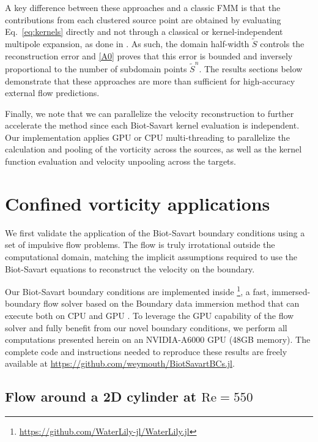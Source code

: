 \documentclass[11pt]{article}
\begin{document}
A key difference between these approaches and a classic FMM is that the contributions from each clustered source point are obtained by evaluating Eq.~\ref{eq:kernels} directly and not through a classical or kernel-independent multipole expansion, as done in \cite{Ying2004ADimensions, Liska2014AEquations}. As such, the domain half-width $\tilde S$ controls the reconstruction error and \ref{A0} proves that this error is bounded and inversely proportional to the number of subdomain points $\tilde S^n$. The results sections below demonstrate that these approaches are more than sufficient for high-accuracy external flow predictions.

Finally, we note that we can parallelize the velocity reconstruction to further accelerate the method since each Biot-Savart kernel evaluation is independent. Our implementation applies GPU or CPU multi-threading to parallelize the calculation and pooling of the vorticity across the sources, as well as the kernel function evaluation and velocity unpooling across the targets.


\section{Confined vorticity applications}

We first validate the application of the Biot-Savart boundary conditions using a set of impulsive flow problems. The flow is truly irrotational outside the computational domain, matching the implicit assumptions required to use the Biot-Savart equations to reconstruct the velocity on the boundary. 

Our Biot-Savart boundary conditions are implemented inside \textbf{}\footnote{\url{https://github.com/WaterLily-jl/WaterLily.jl}}, a fast, immersed-boundary flow solver based on the Boundary data immersion method \cite{Maertens2015} that can execute both on CPU and GPU \cite{Weymouth2025WaterLily.jl:Bodies}. To leverage the GPU capability of the flow solver and fully benefit from our novel boundary conditions, we perform all computations presented herein on an NVIDIA-A6000 GPU (48GB memory). The complete code and instructions needed to reproduce these results are freely available at \url{https://github.com/weymouth/BiotSavartBCs.jl}.


\subsection{Flow around a 2D cylinder at $\text{Re}=550$}
\end{document}
